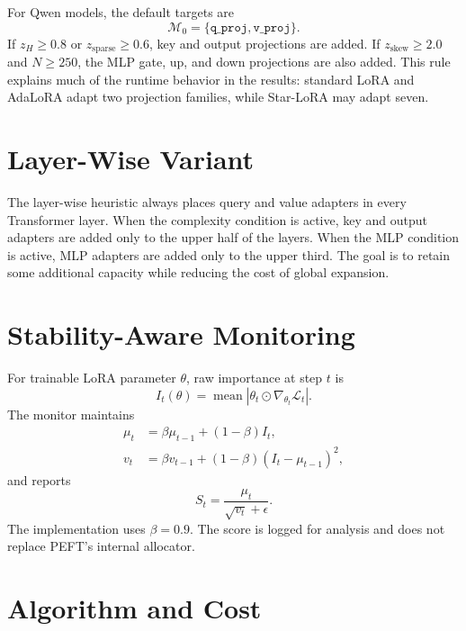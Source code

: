For Qwen models, the default targets are
\[
  \mathcal{M}_0=\{\texttt{q\_proj},\texttt{v\_proj}\}.
\]
If $z_H\ge 0.8$ or $z_{\mathrm{sparse}}\ge 0.6$, key and output projections are added. If
$z_{\mathrm{skew}}\ge 2.0$ and $N\ge 250$, the MLP gate, up, and down projections are also added.
This rule explains much of the runtime behavior in the results: standard LoRA and AdaLoRA adapt
two projection families, while Star-LoRA may adapt seven.

\section{Layer-Wise Variant}

The layer-wise heuristic always places query and value adapters in every Transformer layer. When
the complexity condition is active, key and output adapters are added only to the upper half of
the layers. When the MLP condition is active, MLP adapters are added only to the upper third.
The goal is to retain some additional capacity while reducing the cost of global expansion.

\section{Stability-Aware Monitoring}

For trainable LoRA parameter $\theta$, raw importance at step $t$ is
\begin{equation}
  I_t(\theta)=
  \operatorname{mean}\left|
  \theta_t\odot\nabla_{\theta_t}\mathcal{L}_t
  \right|.
  \label{eq:raw-importance}
\end{equation}
The monitor maintains
\begin{align}
  \mu_t &= \beta\mu_{t-1}+(1-\beta)I_t,\\
  v_t &= \beta v_{t-1}+(1-\beta)(I_t-\mu_{t-1})^2,
\end{align}
and reports
\begin{equation}
  S_t = \frac{\mu_t}{\sqrt{v_t}+\epsilon}.
  \label{eq:stable-importance}
\end{equation}
The implementation uses $\beta=0.9$. The score is logged for analysis and does not replace PEFT's
internal allocator.

\section{Algorithm and Cost}

